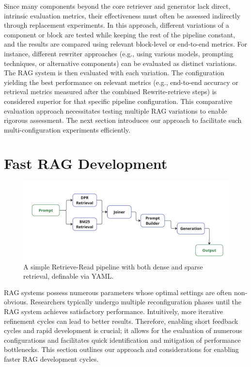 Since many components beyond the core retriever and generator lack direct, intrinsic evaluation metrics, their effectiveness must often be assessed indirectly through replacement experiments. In this approach, different variations of a component or block are tested while keeping the rest of the pipeline constant, and the results are compared using relevant block-level or end-to-end metrics. For instance, different rewriter approaches (e.g., using various models, prompting techniques, or alternative components) can be evaluated as distinct variations. The RAG system is then evaluated with each variation. The configuration yielding the best performance on relevant metrics (e.g., end-to-end accuracy or retrieval metrics measured after the combined Rewrite-retrieve steps) is considered superior for that specific pipeline configuration. This comparative evaluation approach necessitates testing multiple RAG variations to enable rigorous assessment. The next section introduces our approach to facilitate such multi-configuration experiments efficiently.

\section{Fast RAG Development}\label{sec:fastrag}

\begin{figure}[!ht]
    \centering
    \includegraphics[width=\textwidth]{images/showcase-pipeline.pdf}
    \caption{A simple Retrieve-Read pipeline with both dense and sparse retrieval, definable via YAML.}
    \label{fig:showcase}
\end{figure}

RAG systems possess numerous parameters whose optimal settings are often non-obvious. Researchers typically undergo multiple reconfiguration phases until the RAG system achieves satisfactory performance. Intuitively, more iterative refinement cycles can lead to better results. Therefore, enabling short feedback cycles and rapid development is crucial; it allows for the evaluation of numerous configurations and facilitates quick identification and mitigation of performance bottlenecks. This section outlines our approach and considerations for enabling faster RAG development cycles.

